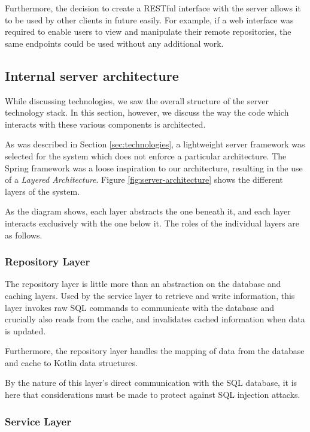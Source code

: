 Furthermore, the decision to create a RESTful interface with the server allows it to be used by other clients in future easily. For example, if a web interface was required to enable users to view and manipulate their remote repositories, the same endpoints could be used without any additional work.

\subsection{Internal server architecture}\label{sec:server-architecture}

While discussing technologies, we saw the overall structure of the server technology stack. In this section, however, we discuss the way the code which interacts with these various components is architected.

As was described in Section \ref{sec:technologies}, a lightweight server framework was selected for the system which does not enforce a particular architecture. The Spring framework was a loose inspiration to our architecture, resulting in the use of a \emph{Layered Architecture}. Figure \ref{fig:server-architecture} shows the different layers of the system.

As the diagram shows, each layer abstracts the one beneath it, and each layer interacts exclusively with the one below it. The roles of the individual layers are as follows.


\subsubsection{Repository Layer}

The repository layer is little more than an abstraction on the database and caching layers. Used by the service layer to retrieve and write information, this layer invokes raw SQL commands to communicate with the database and crucially also reads from the cache, and invalidates cached information when data is updated.

Furthermore, the repository layer handles the mapping of data from the database and cache to Kotlin data structures.

By the nature of this layer's direct communication with the SQL database, it is here that considerations must be made to protect against SQL injection attacks.


\subsubsection{Service Layer}

